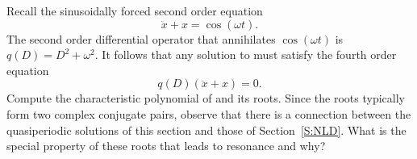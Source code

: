 \documentclass{ximera}
\begin{document}
\begin{exercise}  \label{c12.5.4}
Recall the sinusoidally forced second order equation 
\[
\ddot x + x = \cos(\omega t).
\]
The second order differential operator that annihilates $\cos(\omega t)$ is
$q(D)=D^2+\omega^2$.  It follows that any solution to  must
satisfy the fourth order equation 
\begin{equation} \label{E:ann=res}
q(D)(\ddot x + x)=0.
\end{equation}
Compute the characteristic polynomial of  and its roots. Since
the roots typically form two complex conjugate pairs, observe that there is a
connection between the quasiperiodic solutions of this section and those of
Section~\ref{S:NLD}.  What is the special property of these roots that leads
to resonance and why?
\end{exercise}
\end{document}

